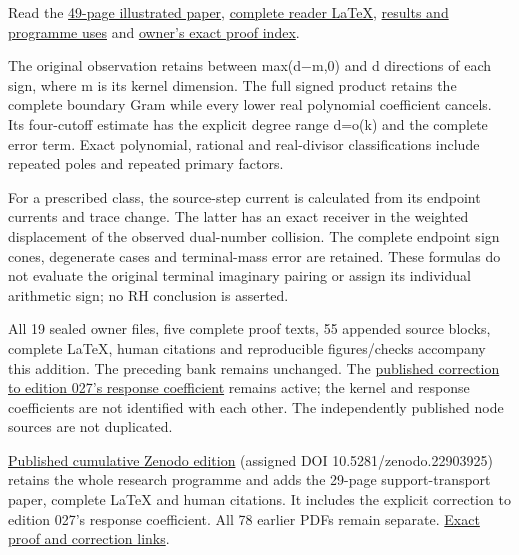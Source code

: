 \documentclass[
]{article}
\begin{document}
Read the
\href{https://github.com/KokunoYumeto/zeta-function-research-reader/blob/main/workbenches/splitzero-tandem/continuations/20260922-real-words-source-steps/REAL_WORDS_AND_SOURCE_STEPS.pdf}{49-page
illustrated paper},
\href{https://github.com/KokunoYumeto/zeta-function-research-reader/blob/main/workbenches/splitzero-tandem/continuations/20260922-real-words-source-steps/REAL_WORDS_AND_SOURCE_STEPS.tex}{complete
reader LaTeX},
\href{https://github.com/KokunoYumeto/zeta-function-research-reader/blob/main/workbenches/splitzero-tandem/continuations/20260922-real-words-source-steps/RESULTS_20260922_029.md}{results
and programme uses} and
\href{https://github.com/KokunoYumeto/zeta-function-research-reader/blob/main/workbenches/splitzero-tandem/continuations/20260922-real-words-source-steps/RESULT_INDEX.json}{owner's
exact proof index}.

The original observation retains between max(d−m,0) and d directions of
each sign, where m is its kernel dimension. The full signed product
retains the complete boundary Gram while every lower real polynomial
coefficient cancels. Its four-cutoff estimate has the explicit degree
range d=o(k) and the complete error term. Exact polynomial, rational and
real-divisor classifications include repeated poles and repeated primary
factors.

For a prescribed class, the source-step current is calculated from its
endpoint currents and trace change. The latter has an exact receiver in
the weighted displacement of the observed dual-number collision. The
complete endpoint sign cones, degenerate cases and terminal-mass error
are retained. These formulas do not evaluate the original terminal
imaginary pairing or assign its individual arithmetic sign; no RH
conclusion is asserted.

All 19 sealed owner files, five complete proof texts, 55 appended source
blocks, complete LaTeX, human citations and reproducible figures/checks
accompany this addition. The preceding bank remains unchanged. The
\href{https://github.com/KokunoYumeto/zeta-function-research-reader/blob/4ba9285b66af58a6d58fc502a494c1fb45ca5b79/workbenches/splitzero-tandem/continuations/20260922-support-transport/CORRECTION_027_RD15.md}{published
correction to edition 027's response coefficient} remains active; the
kernel and response coefficients are not identified with each other. The
independently published node sources are not duplicated.

\href{https://zenodo.org/records/22903925}{Published cumulative Zenodo
edition} (assigned DOI 10.5281/zenodo.22903925) retains the whole
research programme and adds the 29-page support-transport paper,
complete LaTeX and human citations. It includes the explicit correction
to edition 027's response coefficient. All 78 earlier PDFs remain
separate.
\href{https://github.com/KokunoYumeto/zeta-function-research-reader/blob/main/workbenches/splitzero-tandem/continuations/20260922-support-transport-publication/README.md}{Exact
proof and correction links}.
\end{document}
